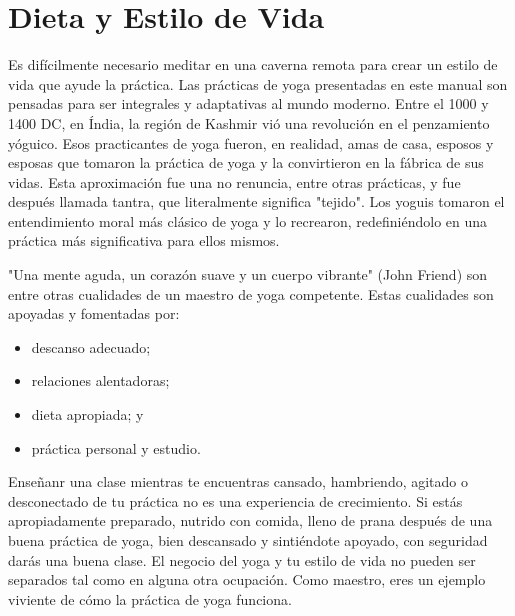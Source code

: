 \section{Dieta y Estilo de Vida}
Es difícilmente necesario meditar en una caverna remota para crear un estilo de vida que ayude la práctica. Las prácticas de yoga presentadas en este manual son pensadas para ser integrales y adaptativas al mundo moderno. Entre el 1000 y 1400 DC, en Índia, la región de Kashmir vió una revolución en el penzamiento yóguico. Esos practicantes de yoga fueron, en realidad, amas de casa, esposos y esposas que tomaron la práctica de yoga y la convirtieron en la fábrica de sus vidas. Esta aproximación fue una no renuncia, entre otras prácticas, y fue después llamada tantra, que literalmente significa "tejido". Los yoguis tomaron el entendimiento moral más clásico de yoga y lo recrearon, redefiniéndolo en una práctica más significativa para ellos mismos.

"Una mente aguda, un corazón suave y un cuerpo vibrante" (John Friend) son entre otras cualidades de un maestro de yoga competente. Estas cualidades son apoyadas y fomentadas por:
\begin{itemize}
	\item descanso adecuado;
	\item relaciones alentadoras;
	\item dieta apropiada; y
	\item práctica personal y estudio.
\end{itemize}

Enseñanr una clase mientras te encuentras cansado, hambriendo, agitado o desconectado de tu práctica no es una experiencia de crecimiento. Si estás apropiadamente preparado, nutrido con comida, lleno de prana después de una buena práctica de yoga, bien descansado y sintiéndote apoyado, con seguridad darás una buena clase. El negocio del yoga y tu estilo de vida no pueden ser separados tal como en alguna otra ocupación. Como maestro, eres un ejemplo viviente de cómo la práctica de yoga funciona.

